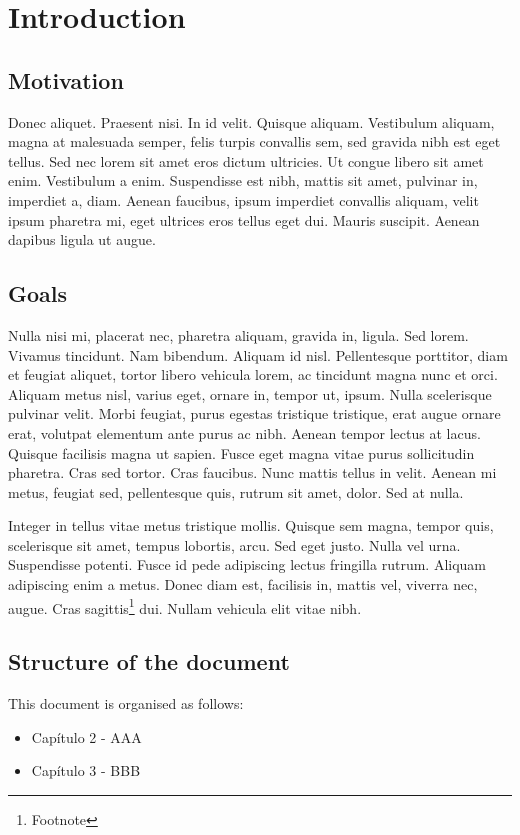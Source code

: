 \chapter{Introduction}

\section{Motivation}
Donec aliquet. Praesent nisi. In id velit. Quisque aliquam. Vestibulum aliquam, magna at malesuada semper, felis turpis convallis sem, sed gravida nibh est eget tellus. Sed nec lorem sit amet eros dictum ultricies. Ut congue libero sit amet enim. Vestibulum a enim. Suspendisse est nibh, mattis sit amet, pulvinar in, imperdiet a, diam. Aenean faucibus, ipsum imperdiet convallis aliquam, velit ipsum pharetra mi, eget ultrices eros tellus eget dui. Mauris suscipit. Aenean dapibus ligula ut augue.

\section{Goals}
Nulla nisi mi, placerat nec, pharetra aliquam, gravida in, ligula. Sed lorem. Vivamus tincidunt. Nam bibendum. Aliquam id nisl. Pellentesque porttitor, diam et feugiat aliquet, tortor libero vehicula lorem, ac tincidunt magna nunc et orci. Aliquam metus nisl, varius eget, ornare in, tempor ut, ipsum. Nulla scelerisque pulvinar velit. Morbi feugiat, purus egestas tristique tristique, erat augue ornare erat, volutpat elementum ante purus ac nibh. Aenean tempor lectus at lacus. Quisque facilisis magna ut sapien. Fusce eget magna vitae purus sollicitudin pharetra. Cras sed tortor. Cras faucibus. Nunc mattis tellus in velit. Aenean mi metus, feugiat sed, pellentesque quis, rutrum sit amet, dolor. Sed at nulla.

Integer in tellus vitae metus tristique mollis. Quisque sem magna, tempor quis, scelerisque sit amet, tempus lobortis, arcu. Sed eget justo. Nulla vel urna. Suspendisse potenti. Fusce id pede adipiscing lectus fringilla rutrum. Aliquam adipiscing enim a metus. Donec diam est, facilisis in, mattis vel, viverra nec, augue. Cras sagittis\footnote{Footnote} dui. Nullam vehicula elit vitae nibh. 

\section{Structure of the document}
This document is organised as follows:
\begin{itemize}
	\item Capítulo 2 - AAA
	\item Capítulo 3 - BBB
\end{itemize}
